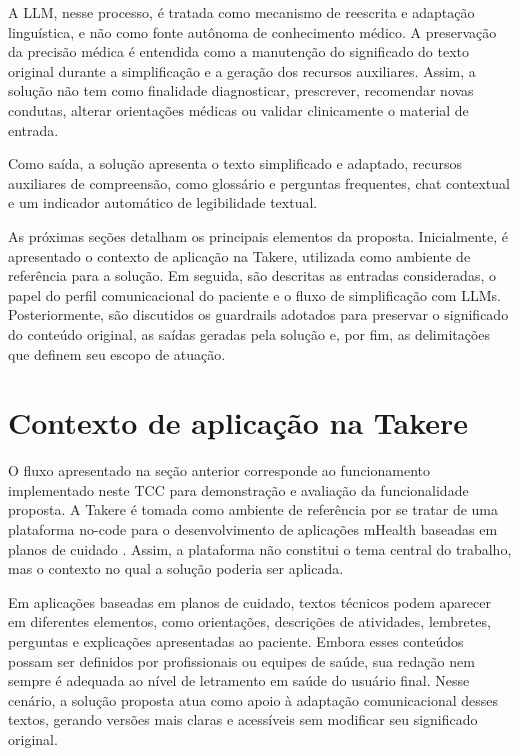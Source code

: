 A LLM, nesse processo, é tratada como mecanismo de reescrita e adaptação linguística, e não como fonte autônoma de conhecimento médico. A preservação da precisão médica é entendida como a manutenção do significado do texto original durante a simplificação e a geração dos recursos auxiliares. Assim, a solução não tem como finalidade diagnosticar, prescrever, recomendar novas condutas, alterar orientações médicas ou validar clinicamente o material de entrada. 

Como saída, a solução apresenta o texto simplificado e adaptado, recursos auxiliares de compreensão, como glossário e perguntas frequentes, chat contextual e um indicador automático de legibilidade textual.

As próximas seções detalham os principais elementos da proposta. Inicialmente, é apresentado o contexto de aplicação na Takere, utilizada como ambiente de referência para a solução. Em seguida, são descritas as entradas consideradas, o papel do perfil comunicacional do paciente e o fluxo de simplificação com LLMs. Posteriormente, são discutidos os guardrails adotados para preservar o significado do conteúdo original, as saídas geradas pela solução e, por fim, as delimitações que definem seu escopo de atuação.

\section{Contexto de aplicação na Takere}
\label{sec:contexto-aplicacao-takere}

O fluxo apresentado na seção anterior corresponde ao funcionamento implementado neste TCC para demonstração e avaliação da funcionalidade proposta. A Takere é tomada como ambiente de referência por se tratar de uma plataforma no-code para o desenvolvimento de aplicações mHealth baseadas em planos de cuidado \cite{niemiec2022takere}. Assim, a plataforma não constitui o tema central do trabalho, mas o contexto no qual a solução poderia ser aplicada. 

Em aplicações baseadas em planos de cuidado, textos técnicos podem aparecer em diferentes elementos, como orientações, descrições de atividades, lembretes, perguntas e explicações apresentadas ao paciente. Embora esses conteúdos possam ser definidos por profissionais ou equipes de saúde, sua redação nem sempre é adequada ao nível de letramento em saúde do usuário final. Nesse cenário, a solução proposta atua como apoio à adaptação comunicacional desses textos, gerando versões mais claras e acessíveis sem modificar seu significado original. 

